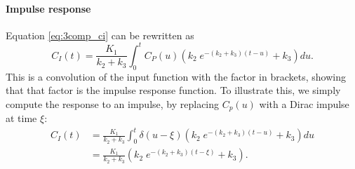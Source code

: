 \documentclass[11pt,oneside]{book}
\begin{document}
\paragraph{Impulse response\\}
Equation \ref{eq:3comp_ci} can be rewritten as
\begin{equation}
  C_I(t) = \frac{K_1}{k_2 + k_3} \int_0^t C_P(u) \left(
       k_2 \; e^{-(k_2 + k_3)(t - u)} + k_3 \right) du.
\end{equation}
This is a convolution of the input function with the factor in
brackets, showing that that factor is the impulse response
function. To illustrate this, we simply compute the response to an
impulse, by replacing $C_p(u)$ with a Dirac impulse at time $\xi$:
\begin{align}
  C_I(t) &= \frac{K_1}{k_2 + k_3} \int_0^t \delta(u-\xi) \left(
                k_2 \; e^{-(k_2 + k_3)(t - u)} + k_3 \right) du\\
   &= \frac{K_1}{k_2 + k_3} \left( k_2 \; e^{-(k_2 + k_3)(t - \xi)} +
                k_3 \right).
\end{align}
\end{document}
